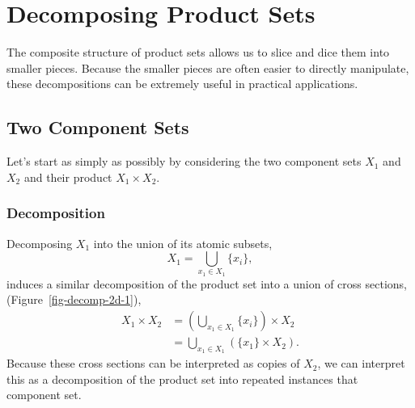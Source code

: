 \documentclass[
  letterpaper,
  DIV=11,
  numbers=noendperiod]{scrartcl}
\begin{document}
\section{Decomposing Product Sets}\label{sec:decomposition}

The composite structure of product sets allows us to slice and dice them
into smaller pieces. Because the smaller pieces are often easier to
directly manipulate, these decompositions can be extremely useful in
practical applications.

\subsection{Two Component Sets}\label{two-component-sets}

Let's start as simply as possibly by considering the two component sets
\(X_{1}\) and \(X_{2}\) and their product \(X_{1} \times X_{2}\).

\subsubsection{Decomposition}\label{decomposition}

Decomposing \(X_{1}\) into the union of its atomic subsets, \[
X_{1} = \bigcup_{ x_{1} \in X_{1} } \{ x_{i} \},
\] induces a similar decomposition of the product set into a union of
cross sections, (Figure~\ref{fig-decomp-2d-1}), \begin{align*}
X_{1} \times X_{2}
&=
\left( \bigcup_{ x_{1} \in X_{1} } \{ x_{i} \} \right)
\times X_{2}
\\
&=
\bigcup_{ x_{1} \in X_{1} }
\left( \{ x_{1} \} \times X_{2} \right).
\end{align*} Because these cross sections can be interpreted as copies
of \(X_{2}\), we can interpret this as a decomposition of the product
set into repeated instances that component set.
\end{document}
